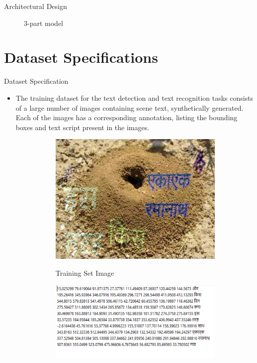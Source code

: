 \documentclass{beamer}
\begin{document}
\begin{frame}[allowframebreaks]{Architectural Design}
\begin{itemize}
\begin{figure}
				\caption{3-part model}
				\label{Slide1}
		\end{figure}
	\end{itemize}
\end{frame}

\section{Dataset Specifications}
\begin{frame}[allowframebreaks]{Dataset Specification}
\begin{itemize}
	\item The training dataset for the text detection and text recognition tasks consists of a large number of images containing scene text, synthetically generated. Each of the images has a corresponding annotation, listing the bounding boxes and text script present in the images.
	\begin{figure}
           \begin{subfigure}[b]{0.2\linewidth}
			{\includegraphics[width=\linewidth]{Train_Dataset_1}}
			\caption{Training Set Image}
			\label{Train_Image}
	\end{subfigure}
	\begin{subfigure}[b]{0.2\linewidth}
			{\includegraphics[width=\linewidth]{Train_Dataset_2}}

\end{subfigure}
\end{figure}
\end{itemize}
\end{frame}
\end{document}

